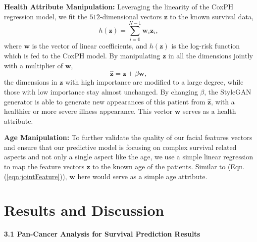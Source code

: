 \documentclass[runningheads]{llncs}
\newcommand{\vz}{\boldsymbol{z}}
\newcommand{\vw}{\boldsymbol{w}}
\newcommand{\TODO}[1]{\textcolor{red}{#1}}
\begin{document}
\noindent\textbf{Health Attribute Manipulation:} Leveraging the linearity of the CoxPH regression model, we fit the $512$-dimensional vectors $\vz$ to the known survival data,
\begin{equation}
h(\vz) =\sum_{i=0}^{N-1}\vw_i \vz_i,
\end{equation}
where $\vw$ is the vector of linear coefficients, and $h(\vz)$ is the log-risk function which is fed to the CoxPH model. By manipulating $\vz$ in all the dimensions jointly with a multiplier of $\vw$,
\begin{equation}
\hat{\vz} = \vz + \beta \vw,
\label{eqn:jointFeature}
\end{equation}
the dimensions in $\vz$ with high importance are modified to a large degree, while those with low importance stay almost unchanged. By changing $\beta$, the StyleGAN generator is able to generate new appearances of this patient from $\hat{\vz}$, with a healthier or more severe illness appearance. This vector $\vw$ serves as a health attribute.

\noindent\textbf{Age Manipulation:} To further validate the quality of our facial features vectors and ensure that our predictive model is focusing on complex survival related aspects and not only a single aspect like the age, we use a simple linear regression to map the feature vectors $\vz$ to the known age of the patients. Similar to (Eqn.\,(\ref{eqn:jointFeature})), $\vw$ here would serve as a simple age attribute.

\section{Results and Discussion}
\textbf{3.1 Pan-Cancer Analysis for Survival Prediction Results}
\end{document}
